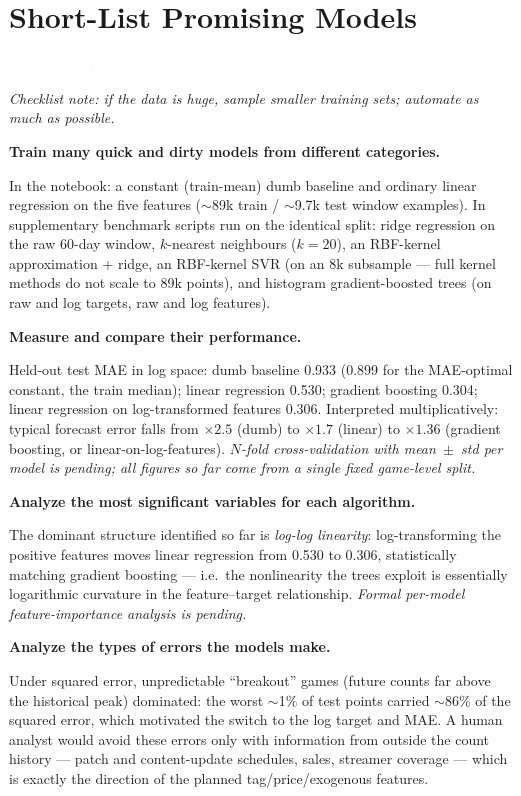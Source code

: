 \documentclass[11pt,a4paper]{article}
\newcommand{\StatusBadge}[2]{\colorbox{#1}{\textcolor{white}{\sffamily\bfseries\footnotesize\;#2\;}}}
\newcommand{\SectionStatus}[2]{\noindent\StatusBadge{#1}{#2}\par\medskip}
\newcommand{\chk}[1]{\item \textbf{#1}\par\nopagebreak\vspace{0.15em}}
\newcommand{\pending}[1][Not yet addressed.]{\textcolor{sttodo}{\itshape #1}}
\newcommand{\guidance}[1]{\textcolor{soft}{\small\itshape Checklist note: #1}\par\medskip}
\begin{document}
\section{Short-List Promising Models}
\SectionStatus{stwip}{IN PROGRESS}
\guidance{if the data is huge, sample smaller training sets; automate as
much as possible.}

\begin{checklist}

\chk{Train many quick and dirty models from different categories.}
In the notebook: a constant (train-mean) dumb baseline and ordinary linear
regression on the five features ($\sim$89k train / $\sim$9.7k test window
examples). In supplementary benchmark scripts run on the identical split:
ridge regression on the raw 60-day window, $k$-nearest neighbours
($k{=}20$), an RBF-kernel approximation + ridge, an RBF-kernel SVR (on an
8k subsample --- full kernel methods do not scale to 89k points), and
histogram gradient-boosted trees (on raw and log targets, raw and log
features).

\chk{Measure and compare their performance.}
Held-out test MAE in log space: dumb baseline 0.933 (0.899 for the
MAE-optimal constant, the train median); linear regression 0.530; gradient
boosting 0.304; linear regression on log-transformed features 0.306.
Interpreted multiplicatively: typical forecast error falls from
$\times 2.5$ (dumb) to $\times 1.7$ (linear) to $\times 1.36$ (gradient
boosting, or linear-on-log-features).
\pending[$N$-fold cross-validation with mean~$\pm$~std per model is
pending; all figures so far come from a single fixed game-level split.]

\chk{Analyze the most significant variables for each algorithm.}
The dominant structure identified so far is \emph{log-log linearity}:
log-transforming the positive features moves linear regression from 0.530
to 0.306, statistically matching gradient boosting --- i.e.\ the
nonlinearity the trees exploit is essentially logarithmic curvature in the
feature--target relationship. \pending[Formal per-model feature-importance
analysis is pending.]

\chk{Analyze the types of errors the models make.}
Under squared error, unpredictable ``breakout'' games (future counts far
above the historical peak) dominated: the worst $\sim$1\% of test points
carried $\sim$86\% of the squared error, which motivated the switch to the
log target and MAE. A human analyst would avoid these errors only with
information from outside the count history --- patch and content-update
schedules, sales, streamer coverage --- which is exactly the direction of
the planned tag/price/exogenous features.


\end{checklist}
\end{document}
